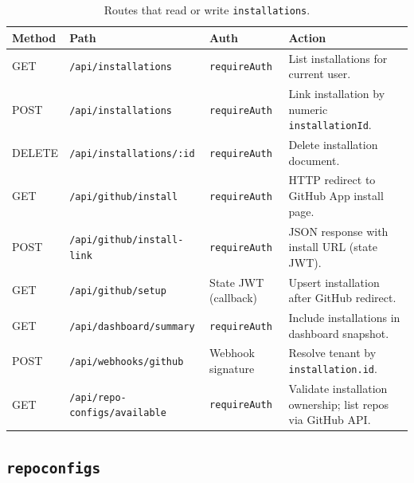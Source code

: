 \begin{table}[htbp]
  \centering
  \caption{Routes that read or write \texttt{installations}.}
  \label{tab:routes-installations}
  \begin{tabular}{@{}lllp{}@{}}
    \toprule
    \textbf{Method} & \textbf{Path} & \textbf{Auth} & \textbf{Action} \\
    \midrule
    GET    & \texttt{/api/installations}           & \texttt{requireAuth}   & List installations for current user. \\
    POST   & \texttt{/api/installations}           & \texttt{requireAuth}   & Link installation by numeric \texttt{installationId}. \\
    DELETE & \texttt{/api/installations/:id}       & \texttt{requireAuth}   & Delete installation document. \\
    GET    & \texttt{/api/github/install}          & \texttt{requireAuth}   & HTTP redirect to GitHub App install page. \\
    POST   & \texttt{/api/github/install-link}     & \texttt{requireAuth}   & JSON response with install URL (state JWT). \\
    GET    & \texttt{/api/github/setup}            & State JWT (callback)   & Upsert installation after GitHub redirect. \\
    GET    & \texttt{/api/dashboard/summary}       & \texttt{requireAuth}   & Include installations in dashboard snapshot. \\
    POST   & \texttt{/api/webhooks/github}         & Webhook signature      & Resolve tenant by \texttt{installation.id}. \\
    GET    & \texttt{/api/repo-configs/available}  & \texttt{requireAuth}   & Validate installation ownership; list repos via GitHub API. \\
    \bottomrule
  \end{tabular}
\end{table}

\subsection{\texttt{repoconfigs}}

